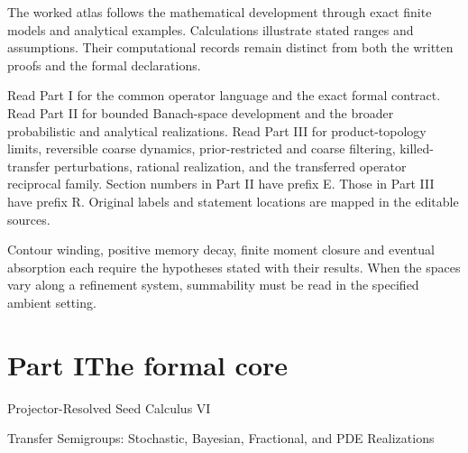 \documentclass[11pt,letterpaper]{article}
\theoremstyle{plain}
\theoremstyle{plain}
\theoremstyle{plain}
\theoremstyle{definition}
\theoremstyle{definition}
\theoremstyle{definition}
\theoremstyle{definition}
\theoremstyle{definition}
\theoremstyle{remark}
\theoremstyle{remark}
\theoremstyle{remark}
\theoremstyle{remark}
\theoremstyle{remark}
\theoremstyle{remark}
\begin{document}
The worked atlas follows the mathematical development through exact finite models and analytical examples. Calculations illustrate stated ranges and assumptions. Their computational records remain distinct from both the written proofs and the formal declarations.

Read Part I for the common operator language and the exact formal contract. Read Part II for bounded Banach-space development and the broader probabilistic and analytical realizations. Read Part III for product-topology limits, reversible coarse dynamics, prior-restricted and coarse filtering, killed-transfer perturbations, rational realization, and the transferred operator reciprocal family. Section numbers in Part II have prefix E. Those in Part III have prefix R. Original labels and statement locations are mapped in the editable sources.

Contour winding, positive memory decay, finite moment closure and eventual absorption each require the hypotheses stated with their results. When the spaces vary along a refinement system, summability must be read in the specified ambient setting.
\clearpage
\tableofcontents
\clearpage
\listoffigures
\listoftables
\clearpage
{}
\part*{Part I\quad The formal core}
\begin{center}\large Projector-Resolved Seed Calculus VI\par\normalsize Transfer Semigroups: Stochastic, Bayesian, Fractional, and PDE Realizations\end{center}
\end{document}
